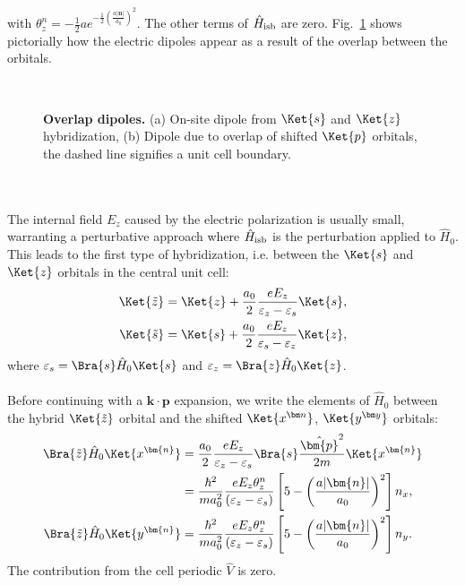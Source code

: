 with $\theta_z^n = -\frac{1}{2}ae^{-\frac{1}{2}\left(\frac{a|\bm{n}|}{a_0}\right)^2}$.
The other terms of $\hat{H}_{\rm isb}$ are zero.
Fig.~\ref{fig:Rashba_overlapdip} shows pictorially how the electric dipoles appear as a result of the overlap between the orbitals. 
\begin{figure}[t]
~\centering
{}\caption{\label{fig:Rashba_overlapdip} {\bf Overlap dipoles.} (a) On-site dipole from $\Ket{s}$ and $\Ket{z}$ hybridization, (b) Dipole due to overlap of shifted $\Ket{p}$ orbitals, the dashed line signifies a unit cell boundary.}
\end{figure}
\\\\
The internal field $E_z$ caused by the electric polarization is usually small, warranting a perturbative approach where $\hat{H}_{\rm isb}$ is the perturbation applied to $\hat{H}_0$.
This leads to the first type of hybridization, i.e. between the $\Ket{s}$ and $\Ket{z}$ orbitals in the central unit cell:
\begin{align}
	\Ket{\tilde{z}} &= \Ket{z} + \frac{a_0}{2}\frac{e E_z}{\varepsilon_z - \varepsilon_s}\Ket{s},\\
	\Ket{\tilde{s}}   &= \Ket{s} +\frac{a_0}{2}\frac{e E_z}{\varepsilon_s - \varepsilon_z}\Ket{z},
\end{align}
where $\varepsilon_s = \Bra{s} \hat{H}_0 \Ket{s}$ and $\varepsilon_z = \Bra{z} \hat{H}_0 \Ket{z}$.
\\\\
Before continuing with a $\bm k \cdot \bm p$ expansion, we write the elements of $\hat{H}_0$ between the hybrid $\Ket{\tilde{z}}$ orbital and the shifted $\Ket{x^{\bm n}}$, $\Ket{y^{\bm y}}$ orbitals:
\begin{align}
	\Bra{\tilde{z}} \hat{H}_0 \Ket{x^{\bm{n}}} &=\frac{a_0}{2} \frac{e E_z}{\varepsilon_z - \varepsilon_s}\Bra{s} \frac{\hat{\bm{p}}^2}{2m} \Ket{x^{\bm{n}}}\\
	&= \frac{\hbar^2}{m a_0^2}\frac{e E_z \theta_z^n}{(\varepsilon_z - \varepsilon_s)} \left[5 - \left(\frac{a |\bm{n}|}{a_0}\right)^2\right]n_x,\\
	\Bra{\tilde{z}} \hat{H}_0 \Ket{y^{\bm{n}}} &=\frac{\hbar^2}{m a_0^2} \frac{e E_z\theta_z^n}{(\varepsilon_z - \varepsilon_s)}\left[5 - \left(\frac{a |\bm{n}|}{a_0}\right)^2\right]n_y.
\end{align}
The contribution from the cell periodic $\hat{V}$ is zero.
\\\\
